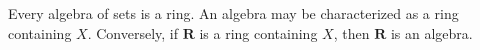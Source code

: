 Every algebra of sets is a ring. An algebra may be characterized as a ring containing $X$. Conversely, if $\mathbf{R}$ is a ring containing $X$, then $\mathbf{R}$ is an algebra.
